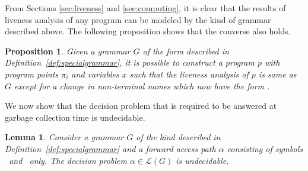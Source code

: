 \documentclass[9pt]{sigplanconf}
\newtheorem{proposition}[theorem]{Proposition}
\newtheorem{lemma}[theorem]{Lemma}
\begin{document}
From Sections \ref{sec:liveness}  and \ref{sec:computing}, it is clear
that the results of liveness analysis of any program can be modeled by
the kind  of grammar described above. The  following proposition shows
that the converse also holds.
\begin{proposition}
Given    a     grammar    $G$    of    the     form    described    in
Definition~\ref{def:specialgrammar},  it is  possible  to construct  a
program $p$  with program points  $\pi_i$ and variables $x$  such that
the liveness  analysis of $p$  is same as  $G$ except for a  change in
non-terminal names which now have the form .
\end{proposition}
We now show that the decision  problem that is required to be answered
at       garbage      collection       time       is      undecidable.
\newcommand{\state}{\ensuremath{\mathsf{S}}}
\newcommand{\nont}[2]{\ensuremath{\mathsf{S}_{#1}^{#2}}}  
\begin{lemma}
Consider    a    grammar    $G$    of   the    kind    described    in
Definition~\ref{def:specialgrammar} and a forward access path $\alpha$
consisting  of symbols \acar\  and \acdr\  only. The  decision problem
$\alpha \in \mathscr{L}(G)$ is undecidable.
\end{lemma} 
\end{document}
